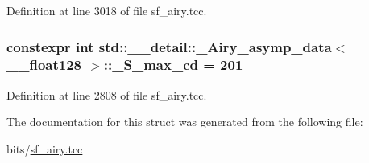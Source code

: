 Definition at line 3018 of file sf\+\_\+airy.\+tcc.

\subsubsection[{\texorpdfstring{\+\_\+\+S\+\_\+max\+\_\+cd}{_S_max_cd}}]{\setlength{\rightskip}{0pt plus 5cm}constexpr int {\bf std\+::\+\_\+\+\_\+detail\+::\+\_\+\+Airy\+\_\+asymp\+\_\+data}$<$ \+\_\+\+\_\+float128 $>$\+::\+\_\+\+S\+\_\+max\+\_\+cd = 201\hspace{0.3cm}{\ttfamily [static]}}\hypertarget{structstd_1_1____detail_1_1__Airy__asymp__data_3_01____float128_01_4_abef02f6e320c7e0740d90c0dab1ba071}{}\label{structstd_1_1____detail_1_1__Airy__asymp__data_3_01____float128_01_4_abef02f6e320c7e0740d90c0dab1ba071}


Definition at line 2808 of file sf\+\_\+airy.\+tcc.



The documentation for this struct was generated from the following file\+:\begin{DoxyCompactItemize}
\item 
bits/\hyperlink{sf__airy_8tcc}{sf\+\_\+airy.\+tcc}\end{DoxyCompactItemize}

